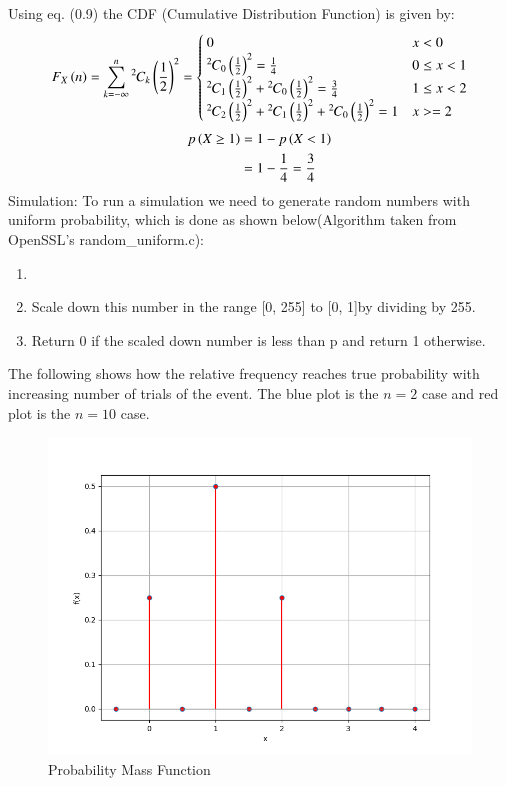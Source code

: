\documentclass[journal]{IEEEtran}
\begin{document}
Using eq. (0.9) the CDF (Cumulative Distribution Function) is given by:
\begin{align}
  F_{X}\left(n\right) = \sum_{k = -\infty}^n{{}^{2}\mkern-1muC_{k}}\left(\frac{1}{2}\right)^2 = \begin{cases}
    0 & x < 0\\
    {{}^{2}\mkern-1muC_{0}}\left(\frac{1}{2}\right)^2 = \frac{1}{4} & 0 \le x < 1\\
    {{}^{2}\mkern-1muC_{1}}\left(\frac{1}{2}\right)^2 + {{}^{2}\mkern-1muC_{0}}\left(\frac{1}{2}\right)^2 = \frac{3}{4}& 1 \le x < 2\\
    {{}^{2}\mkern-1muC_{2}}\left(\frac{1}{2}\right)^2 + {{}^{2}\mkern-1muC_{1}}\left(\frac{1}{2}\right)^2 + {{}^{2}\mkern-1muC_{0}}\left(\frac{1}{2}\right)^2 = 1 & x >=2\\
  \end{cases}
\end{align}
\begin{align}
  p\left(X \ge 1\right) &= 1 - p\left(X < 1\right)\\
  &= 1 - \frac{1}{4} = \frac{3}{4}
\end{align}
Simulation:
\newline
To run a simulation we need to generate random numbers with uniform probability, which is done
as shown below(Algorithm taken from OpenSSL's random\_uniform.c):
\begin{enumerate}
  \item {}
  \item Scale down this number in the range [0, 255] to [0, 1]by dividing by 255.
  \item Return 0 if the scaled down number is less than p and return 1 otherwise. 
\end{enumerate}
The following shows how the relative frequency reaches true probability with increasing number of trials of the event. The blue plot is the $n = 2$ case and red plot is the $n = 10$ case.
\begin{figure}[h!]
   \centering
   \includegraphics[width=0.7\columnwidth]{figs/fig1.png}
    \caption{Probability Mass Function}
\end{figure}
\end{document}
